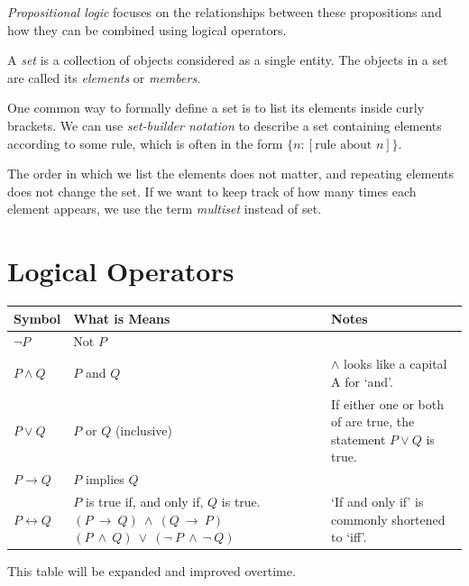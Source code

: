 \documentclass[a4paper, twoside]{article}
\newcommand{\rarrow}{\rightarrow}
\newcommand{\ioi}{\longleftrightarrow}
\begin{document}
\textit{Propositional logic} focuses on the relationships between these propositions and how they can be combined using logical operators.

A \textit{set} is a collection of objects considered as a single entity. The objects in a set are called its \textit{elements} or \textit{members}. 

One common way to formally define a set is to list its elements inside curly brackets. We can use \textit{set-builder notation} to describe a set containing elements according to some rule, which is often in the form \(\{n : [\text{rule about } n]\}\). 

The order in which we list the elements does not matter, and repeating elements does not change the set. If we want to keep track of how many times each element appears, we use the term \textit{multiset} instead of set.

\newpage

\section{Logical Operators}
\begin{table}[H]
    \centering
    \begin{tabular}{|>{\centering\arraybackslash}p{2.5cm}|p{5.5cm}|p{6cm}|}
        \hline 
        \textbf{Symbol} & 
        \textbf{What is Means} & 
        \textbf{Notes}
        \\\hline
        \(\neg P\)  & 
        Not \(P\) &
        \\\hline
        \(P \land Q\) & 
        \(P\) and \(Q\) & 
        \(\land\) looks like a capital A for `and'.
        \\\hline
        \(P \lor Q\) 
        & \(P\) or \(Q\) (inclusive) 
        & If either one or both of are true, the statement \(P \lor Q\) is true.
        \\\hline
        \(P \rarrow Q\) 
        & \(P\) implies \(Q\) 
        & 
        \\\hline
        \(P \ioi Q\) &
        \makecell[l]{
            \(P\) is true if, and only if, \(Q\) is true. \\
            \((P~\rarrow~Q)~\land~(Q~\rarrow~P)\) \\
            \((P~\land~Q)~\lor~(\neg~P~\land~\neg~Q)\)
        }&
        `If and only if' is commonly shortened to `iff'.
        \\\hline
    \end{tabular}
\end{table}
This table will be expanded and improved overtime.
\end{document}
